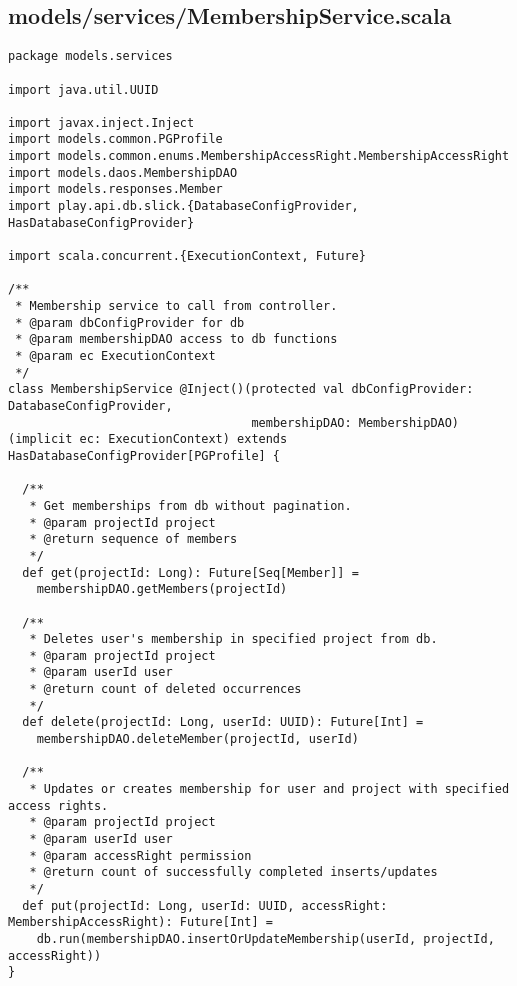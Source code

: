 \subsection{models/services/MembershipService.scala}
\begin{lstlisting}
package models.services

import java.util.UUID

import javax.inject.Inject
import models.common.PGProfile
import models.common.enums.MembershipAccessRight.MembershipAccessRight
import models.daos.MembershipDAO
import models.responses.Member
import play.api.db.slick.{DatabaseConfigProvider, HasDatabaseConfigProvider}

import scala.concurrent.{ExecutionContext, Future}

/**
 * Membership service to call from controller.
 * @param dbConfigProvider for db
 * @param membershipDAO access to db functions
 * @param ec ExecutionContext
 */
class MembershipService @Inject()(protected val dbConfigProvider: DatabaseConfigProvider,
                                  membershipDAO: MembershipDAO) (implicit ec: ExecutionContext) extends HasDatabaseConfigProvider[PGProfile] {

  /**
   * Get memberships from db without pagination.
   * @param projectId project
   * @return sequence of members
   */
  def get(projectId: Long): Future[Seq[Member]] =
    membershipDAO.getMembers(projectId)

  /**
   * Deletes user's membership in specified project from db.
   * @param projectId project
   * @param userId user
   * @return count of deleted occurrences
   */
  def delete(projectId: Long, userId: UUID): Future[Int] =
    membershipDAO.deleteMember(projectId, userId)

  /**
   * Updates or creates membership for user and project with specified access rights.
   * @param projectId project
   * @param userId user
   * @param accessRight permission
   * @return count of successfully completed inserts/updates
   */
  def put(projectId: Long, userId: UUID, accessRight: MembershipAccessRight): Future[Int] =
    db.run(membershipDAO.insertOrUpdateMembership(userId, projectId, accessRight))
}
\end{lstlisting}
